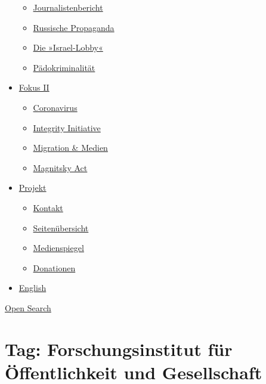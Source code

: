 \begin{itemize}
  \begin{itemize}
  \tightlist
  \item
    \href{https://swprs.org/bericht-eines-journalisten/}{Journalistenbericht}
  \item
    \href{https://swprs.org/russische-propaganda/}{Russische Propaganda}
  \item
    \href{https://swprs.org/die-israel-lobby-fakten-und-mythen/}{Die
    »Israel-Lobby«}
  \item
    \href{https://swprs.org/geopolitik-und-paedokriminalitaet/}{Pädokriminalität}
  \end{itemize}
\item
  \href{https://swprs.org/migration-und-medien/}{Fokus II}

  \begin{itemize}
  \tightlist
  \item
    \href{https://swprs.org/covid-19-hinweis-ii/}{Coronavirus}
  \item
    \href{https://swprs.org/die-integrity-initiative/}{Integrity
    Initiative}
  \item
    \href{https://swprs.org/migration-und-medien/}{Migration \& Medien}
  \item
    \href{https://swprs.org/der-fall-magnitsky/}{Magnitsky Act}
  \end{itemize}
\item
  \href{https://swprs.org/kontakt/}{Projekt}

  \begin{itemize}
  \tightlist
  \item
    \href{https://swprs.org/kontakt/}{Kontakt}
  \item
    \href{https://swprs.org/uebersicht/}{Seitenübersicht}
  \item
    \href{https://swprs.org/medienspiegel/}{Medienspiegel}
  \item
    \href{https://swprs.org/donationen/}{Donationen}
  \end{itemize}
\item
  \href{https://swprs.org/contact/}{English}
\end{itemize}

\protect\hyperlink{}{Open Search}

\hypertarget{tag-forschungsinstitut-fuxfcr-uxf6ffentlichkeit-und-gesellschaft}{%
\section{Tag: Forschungsinstitut für Öffentlichkeit und
Gesellschaft}\label{tag-forschungsinstitut-fuxfcr-uxf6ffentlichkeit-und-gesellschaft}}

